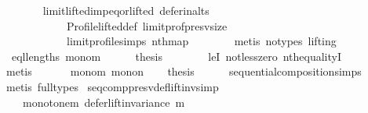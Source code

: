 \begin{isabellebody}
\ \ \ \ \ \ \isamarkupfalse%
\ limit{\isacharunderscore}{\kern0pt}lifted{\isacharunderscore}{\kern0pt}imp{\isacharunderscore}{\kern0pt}eq{\isacharunderscore}{\kern0pt}or{\isacharunderscore}{\kern0pt}lifted\ defer{\isacharunderscore}{\kern0pt}in{\isacharunderscore}{\kern0pt}alts\isanewline
\ \ \ \ \ \ \ \ \ \ \ \ Profile{\isachardot}{\kern0pt}lifted{\isacharunderscore}{\kern0pt}def\ limit{\isacharunderscore}{\kern0pt}prof{\isacharunderscore}{\kern0pt}presv{\isacharunderscore}{\kern0pt}size\isanewline
\ \ \ \ \ \ \ \ \ \ \ \ limit{\isacharunderscore}{\kern0pt}profile{\isachardot}{\kern0pt}simps\ nth{\isacharunderscore}{\kern0pt}map\isanewline
\ \ \ \ \ \ \isamarkupfalse%
\ {\isacharparenleft}{\kern0pt}metis\ {\isacharparenleft}{\kern0pt}no{\isacharunderscore}{\kern0pt}types{\isacharcomma}{\kern0pt}\ lifting{\isacharparenright}{\kern0pt}{\isacharparenright}{\kern0pt}\isanewline
\ \ \ \ \isamarkupfalse%
\ {}\ eql{\isacharunderscore}{\kern0pt}lengths\ mono{\isacharunderscore}{\kern0pt}m\isanewline
\ \ \ \ \isamarkupfalse%
\ {\isacharquery}{\kern0pt}thesis\isanewline
\ \ \ \ \ \ \isamarkupfalse%
\ leI\ not{\isacharunderscore}{\kern0pt}less{\isacharunderscore}{\kern0pt}zero\ nth{\isacharunderscore}{\kern0pt}equalityI\isanewline
\ \ \ \ \ \ \isamarkupfalse%
\ metis\isanewline
\ \ \isamarkupfalse%
\isanewline
\ \ \isamarkupfalse%
\ mono{\isacharunderscore}{\kern0pt}m\ mono{\isacharunderscore}{\kern0pt}n\isanewline
\ \ \isamarkupfalse%
\ {\isacharquery}{\kern0pt}thesis\isanewline
\ \ \ \ \isamarkupfalse%
\ sequential{\isacharunderscore}{\kern0pt}composition{\isachardot}{\kern0pt}simps\isanewline
\ \ \ \ \isamarkupfalse%
\ {\isacharparenleft}{\kern0pt}metis\ {\isacharparenleft}{\kern0pt}full{\isacharunderscore}{\kern0pt}types{\isacharparenright}{\kern0pt}{\isacharparenright}{\kern0pt}\isanewline
{}\isamarkupfalse%
%
\endisatagproof
{\isafoldproof}%
%
\isadelimproof
\isanewline
%
\endisadelimproof
\isanewline
\isanewline
{}\isamarkupfalse%
\ seq{\isacharunderscore}{\kern0pt}comp{\isacharunderscore}{\kern0pt}presv{\isacharunderscore}{\kern0pt}def{\isacharunderscore}{\kern0pt}lift{\isacharunderscore}{\kern0pt}inv{\isacharbrackleft}{\kern0pt}simp{\isacharbrackright}{\kern0pt}{\isacharcolon}{\kern0pt}\isanewline
\ \ \isanewline
\ \ \ \ monotone{\isacharunderscore}{\kern0pt}m{\isacharcolon}{\kern0pt}\ {\isachardoublequoteopen}defer{\isacharunderscore}{\kern0pt}lift{\isacharunderscore}{\kern0pt}invariance\ m{\isachardoublequoteclose}\ \isanewline

\end{isabellebody}
